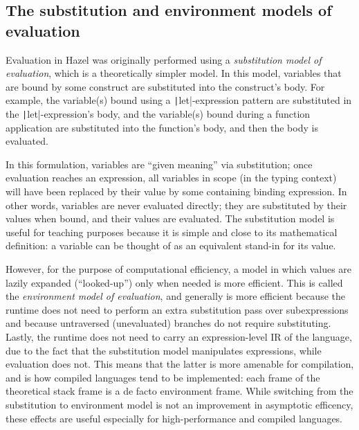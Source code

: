 \subsection{The substitution and environment models of evaluation}
\label{sec:sub-vs-eval}


Evaluation in Hazel was originally performed using a \textit{substitution model of evaluation}, which is a theoretically simpler model. In this model, variables that are bound by some construct are substituted into the construct's body. For example, the variable(s) bound using a \texttt|let|-expression pattern are substituted in the \texttt|let|-expression's body, and the variable(s) bound during a function application are substituted into the function's body, and then the body is evaluated.


In this formulation, variables are ``given meaning'' via substitution; once evaluation reaches an expression, all variables in scope (in the typing context) will have been replaced by their value by some containing binding expression. In other words, variables are never evaluated directly; they are substituted by their values when bound, and their values are evaluated. The substitution model is useful for teaching purposes because it is simple and close to its mathematical definition: a variable can be thought of as an equivalent stand-in for its value.

However, for the purpose of computational efficiency, a model in which values are lazily expanded (``looked-up'') only when needed is more efficient. This is called the \textit{environment model of evaluation}, and generally is more efficient because the runtime does not need to perform an extra substitution pass over subexpressions and because untraversed (unevaluated) branches do not require substituting. Lastly, the runtime does not need to carry an expression-level IR of the language, due to the fact that the substitution model manipulates expressions, while evaluation does not. This means that the latter is more amenable for compilation, and is how compiled languages tend to be implemented: each frame of the theoretical stack frame is a de facto environment frame. While switching from the substitution to environment model is not an improvement in asymptotic efficency, these effects are useful especially for high-performance and compiled languages.


